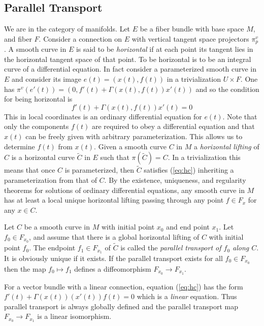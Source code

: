 \documentclass[12pt,titlepage]{article}
\begin{document}
\subsection{Parallel Transport}
We are in the category of manifolds. Let \(E\) be a fiber bundle with
base space \(M\), and fiber \(F\). Consider a
connection on \(E\) with vertical tangent space projectors \(\pi^v_p\).
A smooth curve in \(E\) is said to be {\em horizontal\/}
%
 if at each
point its tangent lies in the horizontal tangent space of that point.
To be horizontal is to be an integral curve of a differential equation.
In fact consider a parameterized smooth curve in \(E\) and
consider its image \(e(t)=(x(t),f(t))\) in a  trivialization \(U\times
F\).
One has \(\pi^v(e'(t)) = (0,f'(t) + \Gamma(x(t),f(t))x'(t))\) and so the
condition for being horizontal is
\begin{equation}\label{eq:hc}
f'(t) + \Gamma(x(t),f(t))x'(t) = 0
\end{equation}%
This in local coordinates is an ordinary differential equation for
\(e(t)\). Note that only the components \(f(t)\) are required to obey a
differential equation and that \(x(t)\) can be freely given with
arbitrary parameterization. This allows us to determine \(f(t)\) from
\(x(t)\). Given a smooth curve \(C\) in \(M\) a {\em horizontal lifting\/}
%
of \(C\) is a horizontal curve \(\tilde C\) in \(E\) such that
\(\pi(\tilde C) = C\).
In a  trivialization this means that once
\(C\) is parameterized, then \(\tilde C\) satisfies (\ref{eq:hc})
inheriting
a parameterization from that of   \(C\). By the
existence, uniqueness, and regularity theorems for solutions of ordinary
differential equations, any smooth curve in \(M\) has at least a local
unique
horizontal lifting passing through any point \(f \in F_x\) for any
\(x\in C\).


Let \(C\) be a smooth curve in \(M\) with initial point \(x_0\) and
end point \(x_1\). Let \(f_0 \in F_{x_0}\), and assume that there is a
global horizontal lifting of \(C\) with initial point \(f_0\). The
endpoint \(f_1\in F_{x_1}\) of \(\tilde C\) is called the {\em parallel
transport
%
 of \(f_0\) along \(C\)\/}. It is obviously unique if it exists.
If the parallel transport exists for all \(f_0\in F_{x_0}\) then the map
\(f_0 \mapsto f_1\) defines a diffeomorphism \(F_{x_0}\to F_{x_1}\).

For a vector bundle with a linear connection, equation (\ref{eq:hc}) has
the form   \(f'(t) + \Gamma(x(t))(x'(t))f(t) = 0\) which is a {\em
linear\/} equation. Thus parallel transport is always globally defined
and the parallel transport map \(F_{x_0}\to F_{x_1}\) is a linear
isomorphism.
\end{document}
